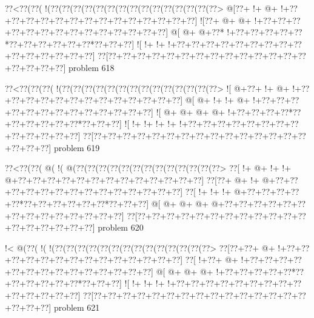 \vbox{\vbox{\goo
\0??<\0??(\0??(\- !(\0??(\0??(\0??(\0??(\0??(\0??(\0??(\0??(\0??(\0??(\0??(\0??(\0??(\0??(\0??>
\- @[\0??+\- !+\- @+\- !+\0??+\0??+\0??+\0??+\0??+\0??+\0??+\0??+\0??+\0??+\0??+\0??+\0??+\0??]
\- ![\0??+\- @+\- @+\- !+\0??+\0??+\0??+\0??+\0??+\0??+\0??+\0??+\0??+\0??+\0??+\0??+\0??+\0??]
\- @[\- @+\- @+\0??*\- !+\0??+\0??+\0??+\0??+\0??*\0??+\0??+\0??+\0??+\0??+\0??*\0??+\0??+\0??]
\- ![\- !+\- !+\- !+\0??+\0??+\0??+\0??+\0??+\0??+\0??+\0??+\0??+\0??+\0??+\0??+\0??+\0??+\0??]
\0??[\0??+\0??+\0??+\0??+\0??+\0??+\0??+\0??+\0??+\0??+\0??+\0??+\0??+\0??+\0??+\0??+\0??+\0??]
}
\hfil problem 618\hfil\break
}



\vbox{\vbox{\goo
\0??<\0??(\0??(\0??(\- !(\0??(\0??(\0??(\0??(\0??(\0??(\0??(\0??(\0??(\0??(\0??(\0??(\0??(\0??>
\- ![\- @+\0??+\- !+\- @+\- !+\0??+\0??+\0??+\0??+\0??+\0??+\0??+\0??+\0??+\0??+\0??+\0??+\0??]
\- @[\- @+\- !+\- !+\- @+\- !+\0??+\0??+\0??+\0??+\0??+\0??+\0??+\0??+\0??+\0??+\0??+\0??+\0??]
\- ![\- @+\- @+\- @+\- @+\- !+\0??+\0??+\0??+\0??*\0??+\0??+\0??+\0??+\0??+\0??*\0??+\0??+\0??]
\- ![\- !+\- !+\- !+\- !+\- !+\0??+\0??+\0??+\0??+\0??+\0??+\0??+\0??+\0??+\0??+\0??+\0??+\0??]
\0??[\0??+\0??+\0??+\0??+\0??+\0??+\0??+\0??+\0??+\0??+\0??+\0??+\0??+\0??+\0??+\0??+\0??+\0??]
}
\hfil problem 619\hfil\break
}



\vbox{\vbox{\goo
\0??<\0??(\0??(\- @(\- !(\- @(\0??(\0??(\0??(\0??(\0??(\0??(\0??(\0??(\0??(\0??(\0??(\0??(\0??>
\0??[\- !+\- @+\- !+\- !+\- @+\0??+\0??+\0??+\0??+\0??+\0??+\0??+\0??+\0??+\0??+\0??+\0??+\0??]
\0??[\0??+\- @+\- !+\- @+\0??+\0??+\0??+\0??+\0??+\0??+\0??+\0??+\0??+\0??+\0??+\0??+\0??+\0??]
\0??[\- !+\- !+\- !+\- @+\0??+\0??+\0??+\0??+\0??*\0??+\0??+\0??+\0??+\0??+\0??*\0??+\0??+\0??]
\- @[\- @+\- @+\- @+\- @+\0??+\0??+\0??+\0??+\0??+\0??+\0??+\0??+\0??+\0??+\0??+\0??+\0??+\0??]
\0??[\0??+\0??+\0??+\0??+\0??+\0??+\0??+\0??+\0??+\0??+\0??+\0??+\0??+\0??+\0??+\0??+\0??+\0??]
}
\hfil problem 620\hfil\break
}



\vbox{\vbox{\goo
\- !<\- @(\0??(\- !(\- !(\0??(\0??(\0??(\0??(\0??(\0??(\0??(\0??(\0??(\0??(\0??(\0??(\0??(\0??>
\0??[\0??+\0??+\- @+\- !+\0??+\0??+\0??+\0??+\0??+\0??+\0??+\0??+\0??+\0??+\0??+\0??+\0??+\0??]
\0??[\- !+\0??+\- @+\- !+\0??+\0??+\0??+\0??+\0??+\0??+\0??+\0??+\0??+\0??+\0??+\0??+\0??+\0??]
\- @[\- @+\- @+\- @+\- !+\0??+\0??+\0??+\0??+\0??*\0??+\0??+\0??+\0??+\0??+\0??*\0??+\0??+\0??]
\- ![\- !+\- !+\- !+\- !+\0??+\0??+\0??+\0??+\0??+\0??+\0??+\0??+\0??+\0??+\0??+\0??+\0??+\0??]
\0??[\0??+\0??+\0??+\0??+\0??+\0??+\0??+\0??+\0??+\0??+\0??+\0??+\0??+\0??+\0??+\0??+\0??+\0??]
}
\hfil problem 621\hfil\break
}



